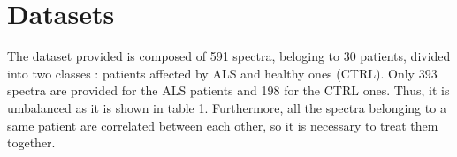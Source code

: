 






\section{Datasets}
The dataset provided is composed of 591 spectra, beloging to 30 patients, divided into two classes : patients affected by ALS and healthy ones (CTRL). Only 393 spectra are provided for the ALS patients and 198 for the CTRL ones. Thus, it is umbalanced as it is shown in table 1. Furthermore, all the spectra belonging to a same patient are correlated between each other, so it is necessary to treat them together.

